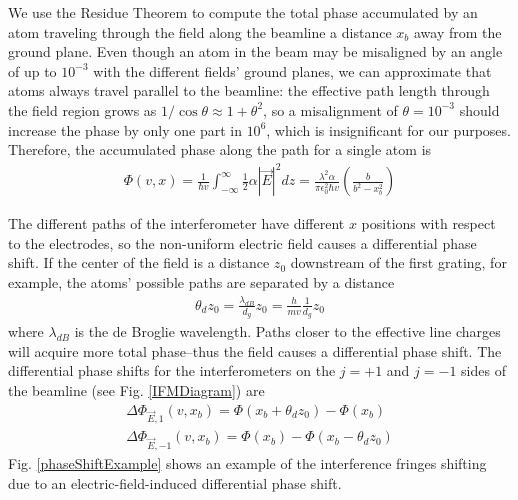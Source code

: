 \documentclass[twocolumn,prl,showpacs,superscriptaddress]{revtex4-1}   %
\newcommand{\figref}[1]{Fig. \ref{#1}}
\begin{document}
We use the Residue Theorem to compute the total phase accumulated by an atom traveling through the field along the beamline a distance $x_b$ away from the ground plane. Even though an atom in the beam may be misaligned by an angle of up to $10^{-3}$ with the different fields' ground planes, we can approximate that atoms always travel parallel to the beamline: the effective path length through the field region grows as $1/\cos{\theta} \approx 1+\theta^2$, so a misalignment of $\theta = 10^{-3}$ should increase the phase by only one part in $10^6$, which is insignificant for our purposes. Therefore, the accumulated phase along the path for a single atom is
\begin{align}
	\Phi(v,x) = 
	\frac{1}{\hbar v} \int_{-\infty}^{\infty} \frac{1}{2} \alpha |\vec{E}|^2 dz =	
	\frac{\lambda^2 \alpha}{\pi \epsilon_0^2 \hbar v}
	\left( \frac{b}{b^2-x_b^2} \right)
	\label{accumPhasePillars}
\end{align}

The different paths of the interferometer have different $x$ positions with respect to the electrodes, so the non-uniform electric field causes a differential phase shift. If the center of the field is a distance $z_0$ downstream of the first grating, for example, the atoms' possible paths are separated by a distance 
\begin{align}
	\theta_d z_0 = \frac{\lambda_{dB}}{d_g} z_0 = \frac{h}{mv}\frac{1}{d_g} z_0
	\label{pathSeparation}
\end{align}
where $\lambda_{dB}$ is the de Broglie wavelength. Paths closer to the effective line charges will acquire more total phase--thus the field causes a differential phase shift. The differential phase shifts for the interferometers on the $j=+1$ and $j=-1$ sides of the beamline (see \figref{IFMDiagram}) are
\begin{align}
	\Delta\Phi_{\vec{E},1}(v,x_b) = \Phi(x_b+\theta_d z_0) - \Phi(x_b) \nonumber \\
	\Delta\Phi_{\vec{E},-1}(v,x_b) = \Phi(x_b) - \Phi(x_b-\theta_d z_0)
	\label{deltaPhasePillars}
\end{align}
\figref{phaseShiftExample} shows an example of the interference fringes shifting due to an electric-field-induced differential phase shift.
\end{document}
